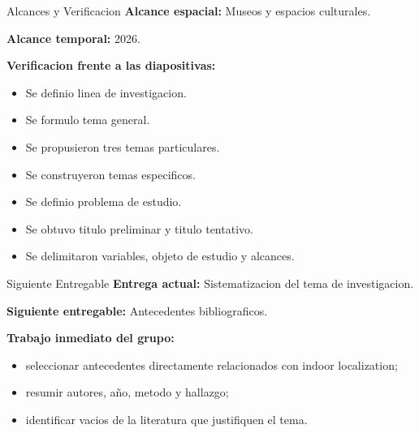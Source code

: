 \documentclass[aspectratio=169,11pt]{beamer}
\begin{document}
\begin{frame}{Alcances y Verificacion}
\justifying
\textbf{Alcance espacial:} Museos y espacios culturales.

\textbf{Alcance temporal:} 2026.

\vspace{0.8em}

\textbf{Verificacion frente a las diapositivas:}
\begin{itemize}
  \item Se definio linea de investigacion.
  \item Se formulo tema general.
  \item Se propusieron tres temas particulares.
  \item Se construyeron temas especificos.
  \item Se definio problema de estudio.
  \item Se obtuvo titulo preliminar y titulo tentativo.
  \item Se delimitaron variables, objeto de estudio y alcances.
\end{itemize}
\end{frame}

\begin{frame}{Siguiente Entregable}
\justifying
\textbf{Entrega actual:} Sistematizacion del tema de investigacion.

\vspace{0.7em}

\textbf{Siguiente entregable:} Antecedentes bibliograficos.

\vspace{0.7em}

\textbf{Trabajo inmediato del grupo:}
\begin{itemize}
  \item seleccionar antecedentes directamente relacionados con indoor localization;
  \item resumir autores, año, metodo y hallazgo;
  \item identificar vacios de la literatura que justifiquen el tema.
\end{itemize}
\end{frame}
\end{document}
